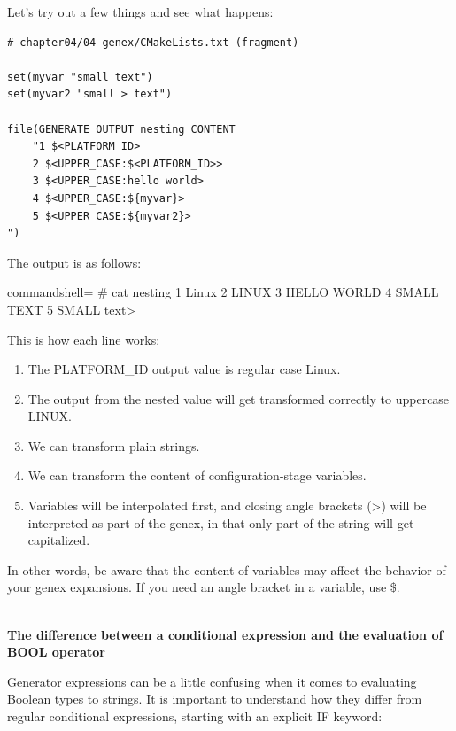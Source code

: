 Let's try out a few things and see what happens:

\begin{lstlisting}[style=styleCMake]
# chapter04/04-genex/CMakeLists.txt (fragment)

set(myvar "small text")
set(myvar2 "small > text")

file(GENERATE OUTPUT nesting CONTENT
	"1 $<PLATFORM_ID>
	2 $<UPPER_CASE:$<PLATFORM_ID>>
	3 $<UPPER_CASE:hello world>
	4 $<UPPER_CASE:${myvar}>
	5 $<UPPER_CASE:${myvar2}>
")
\end{lstlisting}

The output is as follows:

\begin{tcblisting}{commandshell={}}
# cat nesting
1 Linux
  2 LINUX
  3 HELLO WORLD
  4 SMALL TEXT
  5 SMALL text>
\end{tcblisting}

This is how each line works:

\begin{enumerate}
\item 
The PLATFORM\_ID output value is regular case Linux.

\item 
The output from the nested value will get transformed correctly to uppercase LINUX.

\item 
We can transform plain strings.

\item 
We can transform the content of configuration-stage variables.

\item 
Variables will be interpolated first, and closing angle brackets (>) will be interpreted as part of the genex, in that only part of the string will get capitalized.
\end{enumerate}

In other words, be aware that the content of variables may affect the behavior of your genex expansions. If you need an angle bracket in a variable, use \$<ANGLE-R>.

\hspace*{\fill} \\ %
\noindent
\textbf{The difference between a conditional expression and the evaluation of BOOL operator}

Generator expressions can be a little confusing when it comes to evaluating Boolean types to strings. It is important to understand how they differ from regular conditional expressions, starting with an explicit IF keyword:

